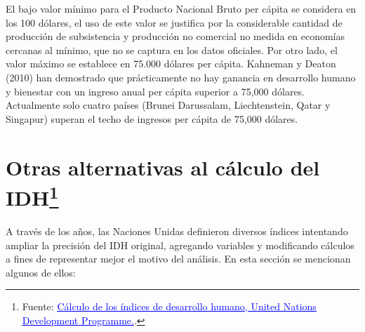 \documentclass[
  10pt,
]{article}
\begin{document}
El bajo valor mínimo para el Producto Nacional Bruto per cápita se
considera en los 100 dólares, el uso de este valor se justifica por la
considerable cantidad de producción de subsistencia y producción no
comercial no medida en economías cercanas al mínimo, que no se captura
en los datos oficiales. Por otro lado, el valor máximo se establece en
75.000 dólares per cápita. Kahneman y Deaton (2010) han demostrado que
prácticamente no hay ganancia en desarrollo humano y bienestar con un
ingreso anual per cápita superior a 75,000 dólares. Actualmente solo
cuatro países (Brunei Darussalam, Liechtenstein, Qatar y Singapur)
superan el techo de ingresos per cápita de 75,000 dólares.

\pagebreak

\section[Otras alternativas al cálculo del IDH]{\texorpdfstring{Otras
alternativas al cálculo del
IDH\footnote{Fuente:
  \href{https://www.undp.org/sites/g/files/zskgke326/files/2023-09/notas_tecnicas.pdf}{\textcolor{blue}{\underline{Cálculo de los índices de desarrollo humano, United Nations Development Programme.}}}.}}{Otras alternativas al cálculo del IDH}}\label{otras-alternativas-al-cuxe1lculo-del-idh2}

A través de los años, las Naciones Unidas definieron diversos índices
intentando ampliar la precisión del IDH original, agregando variables y
modificando cálculos a fines de representar mejor el motivo del
análisis. En esta sección se mencionan algunos de ellos:
\end{document}

